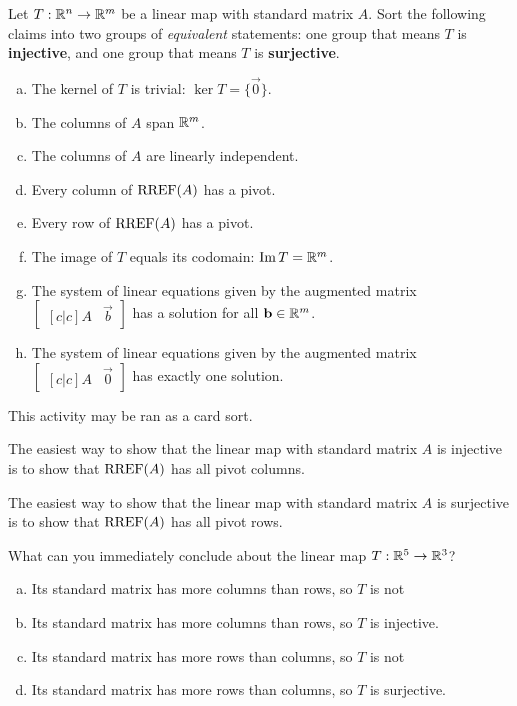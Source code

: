 \begin{applicationActivities}
\begin{activity}{15}
Let $T: \mathbb{R}^n \rightarrow \mathbb{R}^m$ be a linear map with standard matrix $A$.
Sort the following claims into two groups of \textit{equivalent} statements:
one group that means \(T\) is \textbf{injective}, and one group that means
\(T\) is \textbf{surjective}.
\begin{multicols}{2}
\begin{enumerate}[(a)]
\item The kernel of \(T\) is trivial: \(\ker T=\{\vec 0\}\).
\item The columns of $A$ span $\mathbb{R}^m$.
\item The columns of $A$ are linearly independent.
\item Every column of $\operatorname{RREF}(A)$ has a pivot.
\item Every row of $\operatorname{RREF}(A)$ has a pivot.
\item The image of \(T\) equals its codomain: \(\operatorname{Im} T=\mathbb{R}^m\).
\item The system of linear equations given by the augmented matrix $\begin{bmatrix}[c|c]A & \vec{b} \end{bmatrix}$ has a solution for all $\mathbf{b} \in \mathbb{R}^m$.
\item The system of linear equations given by the augmented matrix $\begin{bmatrix}[c|c] A & \vec{0} \end{bmatrix}$ has exactly one solution.
\end{enumerate}
\end{multicols}
\begin{instructorNote}
  This activity may be ran as a card sort.
\end{instructorNote}
\end{activity}

\begin{observation}
  The easiest way to show that the linear map with standard matrix \(A\)
  is injective is to show that \(\operatorname{RREF}(A)\) has all pivot columns.

  \vspace{1em}

  The easiest way to show that the linear map with standard matrix \(A\)
  is surjective is to show that \(\operatorname{RREF}(A)\) has all pivot rows.
\end{observation}

\begin{activity}{3}
  What can you immediately conclude about the linear map \(T:\mathbb{R}^5\to\mathbb{R}^3\)?
  \begin{enumerate}[a)]
    \item Its standard matrix has more columns than rows, so \(T\) is not
    \item Its standard matrix has more columns than rows, so \(T\) is 
    injective.
    \item Its standard matrix has more rows than columns, so \(T\) is not
    \item Its standard matrix has more rows than columns, so \(T\) is 
    surjective.
  \end{enumerate}
\end{activity}


\end{applicationActivities}

